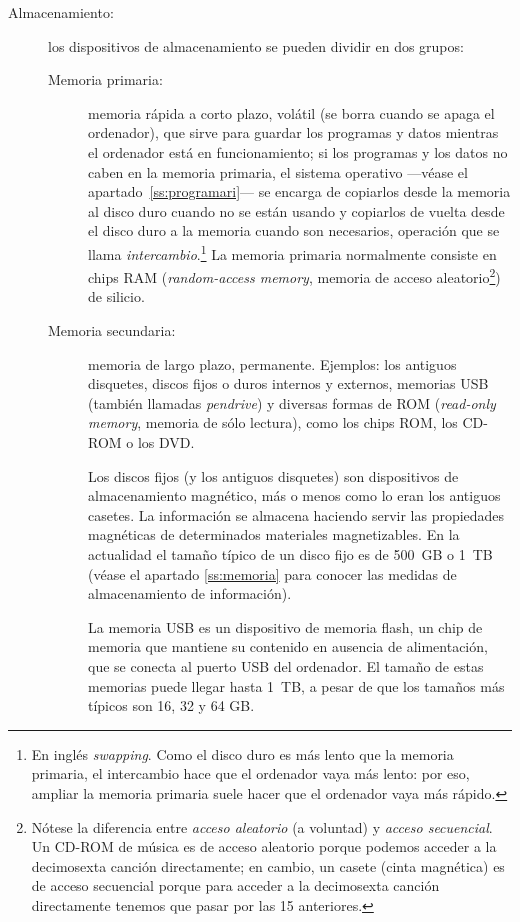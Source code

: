 \begin{description}
\item[Almacenamiento:] los dispositivos de almacenamiento se pueden dividir en dos grupos: \begin{description} \item[Memoria primaria:] memoria rápida a corto plazo, volátil (se borra cuando se apaga el ordenador), que sirve para guardar los programas y datos mientras el ordenador está en funcionamiento; si los programas y los datos no caben en la memoria primaria, el sistema operativo ---véase el apartado~\ref{ss:programari}--- se encarga de copiarlos desde la memoria al disco duro cuando no se están usando y copiarlos de vuelta desde el disco duro a la memoria cuando son necesarios, operación que se llama \emph{intercambio}.\footnote{En inglés \emph{swapping}. Como el disco duro es más lento que la memoria primaria, el intercambio hace que el ordenador vaya más lento: por eso, ampliar la memoria primaria suele hacer que el ordenador vaya más rápido.} La memoria primaria normalmente consiste en chips RAM (\emph{random-access memory}, memoria de acceso aleatorio\footnote{Nótese la diferencia entre \emph{acceso aleatorio} (a voluntad) y \emph{acceso secuencial}. Un CD-ROM de música es de acceso aleatorio porque podemos acceder a la decimosexta canción directamente; en cambio, un casete (cinta magnética) es de acceso secuencial porque para acceder a la decimosexta canción directamente tenemos que pasar por las 15 anteriores.}) de silicio. 

\item[Memoria secundaria:] memoria de largo plazo, permanente. Ejemplos: los antiguos disquetes, discos fijos o duros internos y externos, memorias USB (también llamadas \emph{pendrive}) y diversas formas de ROM (\emph{read-only memory}, memoria de sólo lectura), como los chips ROM, los CD-ROM o los DVD. 

Los discos fijos (y los antiguos disquetes) son dispositivos de almacenamiento magnético, más o menos como lo eran los antiguos casetes. La información se almacena haciendo servir las propiedades magnéticas de determinados materiales magnetizables. En la actualidad el tamaño típico de un disco fijo es de 500~GB o 1~TB (véase el apartado \ref{ss:memoria} para conocer las medidas de almacenamiento de información). 

La memoria USB es un dispositivo de memoria flash, un chip de memoria que mantiene su contenido en ausencia de alimentación, que se conecta al puerto USB del ordenador. El tamaño de estas memorias puede llegar hasta 1~TB, a pesar de que los tamaños más típicos son 16, 32 y 64 GB. 


\end{description}
\end{description}
